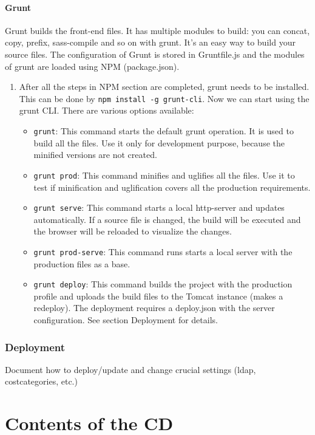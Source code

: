 \subsubsection{Grunt}
Grunt builds the front-end files. It has multiple modules to build: you can concat, copy, prefix, sass-compile and so on with grunt. It’s an easy way to build your source files. The configuration of Grunt is stored in Gruntfile.js and the modules of grunt are loaded using NPM (package.json).
\begin{enumerate}
  \item After all the steps in NPM section are completed, grunt needs to be installed. This can be done by \texttt{npm install -g grunt-cli}. Now we can start using the grunt CLI. There are various options available:
  \begin{itemize}
      \item \texttt{grunt}: This command starts the default grunt operation. It is used to build all the files. Use it only for development purpose, because the minified versions are not created.
      \item \texttt{grunt prod}: This command minifies and uglifies all the files. Use it to test if minification and uglification covers all the production requirements.
      \item \texttt{grunt serve}: This command starts a local http-server and updates automatically. If a source file is changed, the build will be executed and the browser will be reloaded to visualize the changes.
      \item \texttt{grunt prod-serve}: This command runs starts a local server with the production files as a base.
      \item \texttt{grunt deploy}: This command builds the project with the production profile and uploads the build files to the Tomcat instance (makes a redeploy). The deployment requires a deploy.json with the server configuration. See section Deployment for details.
    \end{itemize}
\end{enumerate}

\subsection{Deployment}

Document how to deploy/update and change crucial settings (ldap, costcategories, etc.)

\chapter{Contents of the CD}
